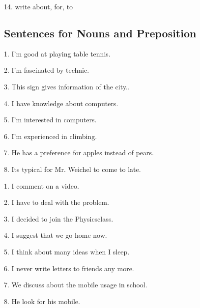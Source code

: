 \documentclass[11pt, oneside]{article}
\begin{document}
14. write about, for, to
\pagebreak

\subsection{Sentences for Nouns and Preposition}

1. I'm good at playing table tennis.

2. I'm fascinated by technic.

3. This sign gives information of the city..

4. I have knowledge about computers.

5. I'm interested in computers.

6. I'm experienced in climbing.

7. He has a preference for apples instead of pears.

8. Its typical for Mr. Weichel to come to late.



1. I comment on a video.

2. I have to deal with the problem.

3. I decided  to join the Physicsclass.

4. I suggest that we go home now.	

5. I think about many ideas when I sleep.

6. I never write letters to friends any more.

7. We discuss about the mobile usage in school.

8. He look for his mobile.
\end{document}
